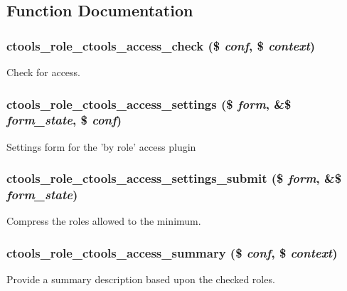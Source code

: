 \subsection{Function Documentation}
\hypertarget{role_8inc_a59fc5cbf5bab8ab64e7a14d0eb969e71}{
\subsubsection[{ctools\_\-role\_\-ctools\_\-access\_\-check}]{\setlength{\rightskip}{0pt plus 5cm}ctools\_\-role\_\-ctools\_\-access\_\-check (\$ {\em conf}, \/  \$ {\em context})}}
\label{role_8inc_a59fc5cbf5bab8ab64e7a14d0eb969e71}
Check for access. \hypertarget{role_8inc_af429c6970ffa2b4a73a05034760ff182}{
\subsubsection[{ctools\_\-role\_\-ctools\_\-access\_\-settings}]{\setlength{\rightskip}{0pt plus 5cm}ctools\_\-role\_\-ctools\_\-access\_\-settings (\$ {\em form}, \/  \&\$ {\em form\_\-state}, \/  \$ {\em conf})}}
\label{role_8inc_af429c6970ffa2b4a73a05034760ff182}
Settings form for the 'by role' access plugin \hypertarget{role_8inc_a22b73bb5fff413945fcb78003c83f166}{
\subsubsection[{ctools\_\-role\_\-ctools\_\-access\_\-settings\_\-submit}]{\setlength{\rightskip}{0pt plus 5cm}ctools\_\-role\_\-ctools\_\-access\_\-settings\_\-submit (\$ {\em form}, \/  \&\$ {\em form\_\-state})}}
\label{role_8inc_a22b73bb5fff413945fcb78003c83f166}
Compress the roles allowed to the minimum. \hypertarget{role_8inc_ac61e26b3347f14f8791b5c1e12793a99}{
\subsubsection[{ctools\_\-role\_\-ctools\_\-access\_\-summary}]{\setlength{\rightskip}{0pt plus 5cm}ctools\_\-role\_\-ctools\_\-access\_\-summary (\$ {\em conf}, \/  \$ {\em context})}}
\label{role_8inc_ac61e26b3347f14f8791b5c1e12793a99}
Provide a summary description based upon the checked roles. 

